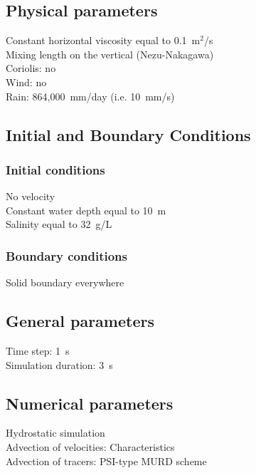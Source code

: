 \subsection{Physical parameters}
%
Constant horizontal viscosity equal to 0.1~m$^2$/s\\
Mixing length on the vertical (Nezu-Nakagawa)\\
Coriolis: no\\
Wind: no\\
Rain: 864,000~mm/day (i.e. 10~mm/s)
%
%
%
%
%
%
\subsection{Initial and Boundary Conditions}
%
\subsubsection{Initial conditions}
%
No velocity\\
Constant water depth equal to 10~m\\
Salinity equal to 32~g/L
%
\subsubsection{Boundary conditions}
%
Solid boundary everywhere
%
\subsection{General parameters}
%
Time step: 1~s\\
Simulation duration: 3~s
%
%
%
\subsection{Numerical parameters}
%
Hydrostatic simulation\\
Advection of velocities: Characteristics\\
Advection of tracers: PSI-type MURD scheme
%
